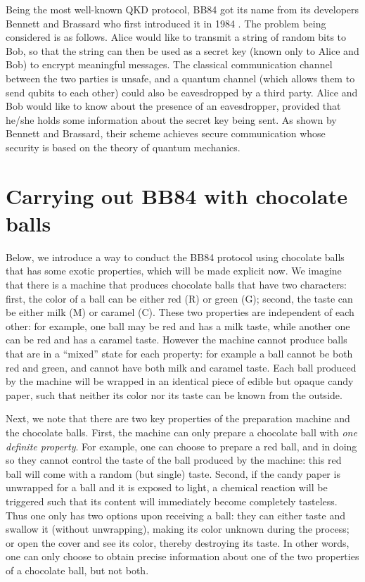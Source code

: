 \documentclass{article}
\def \todo #1{\textcolor{red}{#1}}
\begin{document}
Being the most well-known QKD protocol, BB84 got its name from its developers Bennett and Brassard who first introduced it in 1984 \cite{bennett1984quantum}.
The problem being considered is as follows.
Alice would like to transmit a string of random bits to Bob, so that the string can then be used as a secret key (known only to Alice and Bob) to encrypt meaningful messages.
The classical communication channel between the two parties is unsafe, and a quantum channel (which allows them to send qubits to each other) could also be eavesdropped by a third party.
Alice and Bob would like to know about the presence of an eavesdropper, provided that he/she holds some information about the secret key being sent.
As shown by Bennett and Brassard, their scheme achieves secure communication whose security is based on the theory of quantum mechanics.



\section{Carrying out BB84 with chocolate balls}
Below, we introduce a way to conduct the BB84 protocol using chocolate balls that has some exotic properties, which will be made explicit now. 
We imagine that there is a machine that produces chocolate balls that have two characters: first, the color of a ball can be either red (R) or green (G); second, the taste can be either milk (M) or caramel (C).
These two properties are independent of each other: for example, one ball may be red and has a milk taste, while another one can be red and has a caramel taste.
However the machine cannot produce balls that are in a ``mixed'' state for each property: for example a ball cannot be both red and green, and cannot have both milk and caramel taste.
Each ball produced by the machine will be wrapped in an identical piece of edible but opaque candy paper, such that neither its color nor its taste can be known from the outside.

Next, we note that there are two key properties of the preparation machine and the chocolate balls.
First, the machine can only prepare a chocolate ball with \textit{one definite property}.
For example, one can choose to prepare a red ball, and in doing so they cannot control the taste of the ball produced by the machine: this red ball will come with a random (but single) taste.
Second, if the candy paper is unwrapped for a ball and it is exposed to light, a chemical reaction will be triggered such that its content will immediately become completely tasteless.
Thus one only has two options upon receiving a ball: they can either taste and swallow it (without unwrapping), making its color unknown during the process; or open the cover and see its color, thereby destroying its taste.
In other words, one can only choose to obtain precise information about one of the two properties of a chocolate ball, but not both.
\end{document}
